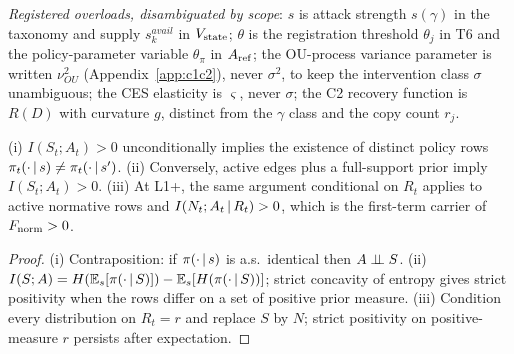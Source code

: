 \emph{Registered overloads, disambiguated by scope}: $s$ is attack strength
$s(\gamma)$ in the taxonomy and supply $s_k^{avail}$ in $V_{\mathrm{state}}$; $\theta$ is
the registration threshold $\theta_j$ in T6 and the policy-parameter variable
$\theta_\pi$ in $A_{\mathrm{ref}}$; the OU-process variance parameter is written
$\nu_{OU}^2$ (Appendix~\ref{app:c1c2}), never $\sigma^2$, to keep the
intervention class $\sigma$ unambiguous; the CES elasticity is
$\varsigma$, never $\sigma$; the C2 recovery function is $R(D)$ with
curvature $g$, distinct from the $\gamma$ class and the copy count $r_j$.

\begin{lemma}\label{lem:ax0}
(i) $I(S_t;A_t)>0$ unconditionally implies the existence of distinct policy
rows $\pi_t(\cdot\,|\, s)\neq\pi_t(\cdot\,|\, s')$. (ii) Conversely, active
edges plus a full-support prior imply $I(S_t;A_t)>0$. (iii) At L1+, the same
argument conditional on $R_t$ applies to active normative rows and
$I(N_t;A_t\,|\, R_t)>0$, which is the first-term carrier of $F_{\mathrm{norm}}>0$.
\end{lemma}
\begin{proof}
(i) Contraposition: if $\pi(\cdot\,|\, s)$ is a.s.\ identical then
$A\perp\!\!\!\perp S$. (ii) $I(S;A)=H(\mathbb{E}_s[\pi(\cdot\,|\, S)]) -
\mathbb{E}_s[H(\pi(\cdot\,|\, S))]$; strict concavity of entropy gives
strict positivity when the rows differ on a set of positive prior measure.
(iii) Condition every distribution on $R_t=r$ and replace $S$ by $N$; strict
positivity on positive-measure $r$ persists after expectation.
\end{proof}
